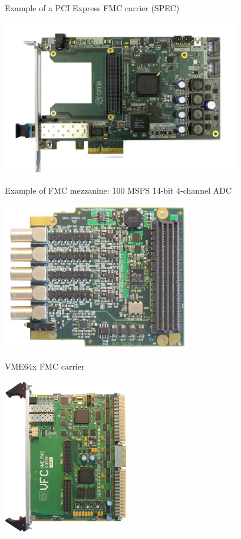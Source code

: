 \documentclass[compress,red]{beamer}
\begin{document}

\begin{frame}{Example of a PCI Express FMC carrier (SPEC)}
 \begin{center}
   \includegraphics[height=6.8cm]{SPEC_top_high_res.jpg}
 \end{center} 
\end{frame}

\begin{frame}{Example of FMC mezzanine: 100 MSPS 14-bit 4-channel ADC}
 \begin{center}
   \includegraphics[height=6.5cm]{adc.jpg}
 \end{center} 
\end{frame}

\begin{frame}{VME64x FMC carrier}
 \begin{center}
   \includegraphics[height=6.9cm]{vfc.jpg}
 \end{center} 
\end{frame}
\end{document}
